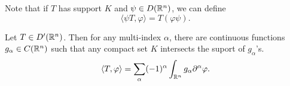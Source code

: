 Note that if $T$ has support $K$ and $\psi\in D(\mathbb{R}^n)$, we can define 
\begin{equation*}
    \langle\psi T, \varphi\rangle = T(\varphi\psi).
\end{equation*}

\begin{theorem}
    Let $T\in D'(\mathbb{R}^n)$. Then for any multi-index $\alpha$, there are continuous functions $g_\alpha\in C(\mathbb{R}^n)$ such that any compact set $K$ intersects the suport of $g_\alpha$'s. 
    \begin{equation*}
        \langle T, \varphi\rangle = \sum_{\alpha} (-1)^\alpha\int_{\mathbb{R}^n} g_\alpha\partial^\alpha\varphi.
    \end{equation*}
\end{theorem}
